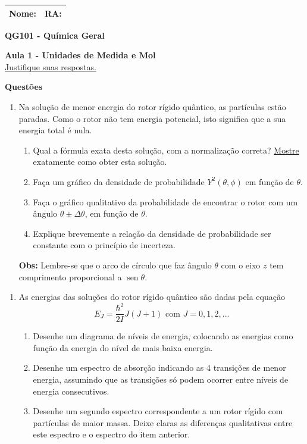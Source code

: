 \documentclass[10pt,a4paper,ssfamily]{exam}
\DeclareMathOperator{\sen}{sen}
\newcommand{\nomera}{
  \noindent
  \begin{tabular}{|p{0.7\textwidth}|p{0.3\textwidth}|}
  Nome: & RA: \\ 
  \hline
  \end{tabular}
}
\newcommand{\qini}{\begin{enumerate}[resume]\item}
\newcommand{\qend}{\end{enumerate}}
\begin{document}
\sffamily
\pagestyle{empty}
\nomera

\begin{center}

{\bf QG101 - Química Geral}

{\bf Aula 1 - Unidades de Medida e Mol}\\
\underline{Justifique suas respostas.}
\end{center}

\begin{center}{\bf Questões}\end{center}

\qini
Na solução de menor energia do rotor rígido quântico, as partículas estão paradas. 
Como o rotor não tem energia potencial, isto significa que a sua energia total é nula.
\begin{enumerate}
\item
Qual a fórmula exata desta solução, com a normalização correta? 
\underline{Mostre} exatamente como obter esta solução.
\item
Faça um gráfico da densidade de probabilidade $Y^2(\theta,\phi)$ em função 
de $\theta$. 
\item
Faça o gráfico qualitativo da probabilidade de encontrar o rotor com um ângulo $\theta\pm\Delta\theta$, em função de $\theta$.
\item
Explique brevemente a relação da densidade de probabilidade ser constante com o princípio de incerteza.
\end{enumerate}
{\bf Obs:} Lembre-se que o arco de círculo que faz ângulo $\theta$ com o eixo $z$
tem comprimento proporcional a $\sen\theta$.
\qend

\qini
As energias das soluções do rotor rígido quântico são dadas pela equação 
\[
E_J = \frac{\hbar^2}{2I}J(J+1)\textrm{ com }J = 0, 1, 2,...
\]
\begin{enumerate}
\item
Desenhe um diagrama de níveis de energia, colocando as energias como função da energia do nível de mais baixa energia.
\item
Desenhe um espectro de absorção indicando as 4 transições de menor energia, assumindo que as transições só podem ocorrer entre níveis de energia consecutivos.
\item
Desenhe um segundo espectro correspondente a um rotor rígido com partículas de maior massa. Deixe claras as diferenças qualitativas entre este espectro e o espectro do item anterior.
\end{enumerate}
\qend
\end{document}
